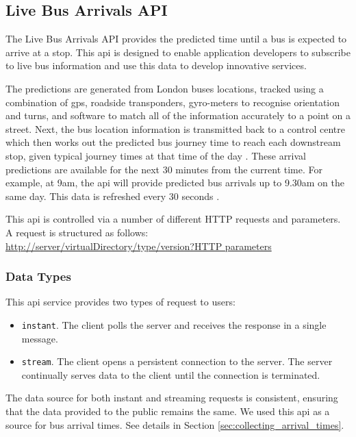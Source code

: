 \subsection{Live Bus Arrivals API}
\par The Live Bus Arrivals API provides the predicted time until a bus is expected to arrive at a stop. This \acrshort{api} is designed to enable application developers to subscribe to live bus information and use this data to develop innovative services\cite{live_bus_api_documentation}.

\par The predictions are generated from London buses locations, tracked using a combination of \acrfull{gps}, roadside transponders, gyro-meters to recognise orientation and turns, and software to match all of the information accurately to a point on a street. Next, the bus location information is transmitted back to a control centre which then works out the predicted bus journey time to reach each downstream stop, given typical journey times at that time of the day \cite{quora_generate_countdown}. These arrival predictions are available for the next 30 minutes from the current time. For example, at 9am, the \acrshort{api} will provide predicted bus arrivals up to 9.30am on the same day. This data is refreshed every 30 seconds \cite{live_bus_api_documentation}.

\par This \acrshort{api} is controlled via a number of different HTTP requests and parameters. A request is structured as follows: \\
\url{http://server/virtualDirectory/type/version?HTTP parameters}

\subsubsection{Data Types}

\par This \acrshort{api} service provides two types of request to users:

\begin{itemize}
  \item \texttt{instant}. The client polls the server and receives the response in a single message.
  \item \texttt{stream}. The client opens a persistent connection to the server. The server continually serves data to the client until the connection is terminated.
\end{itemize}

\par The data source for both instant and streaming requests is consistent, ensuring that the data provided to the public remains the same. We used this \acrshort{api} as a source for bus arrival times. See details in Section \ref{sec:collecting_arrival_times}.

